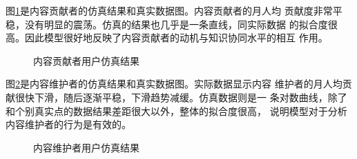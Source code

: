 图\ref{fig:simu3}是内容贡献者的仿真结果和真实数据图。内容贡献者的月人均
贡献度非常平稳，没有明显的震荡。仿真的结果也几乎是一条直线，同实际数据
的拟合度很高。因此模型很好地反映了内容贡献者的动机与知识协同水平的相互
作用。

\begin{figure}[!htb]
  \centering
  \caption{\small{内容贡献者用户仿真结果}}
  \label{fig:simu3}
\end{figure}

图\ref{fig:simu4}是内容维护者的仿真结果和真实数据图。实际数据显示内容
维护者的月人均贡献很快下滑，随后逐渐平稳，下滑趋势减缓。仿真数据则是一
条对数曲线，除了和个别真实点的数据结果差距很大以外，整体的拟合度很高，
说明模型对于分析内容维护者的行为是有效的。
\begin{figure}[!htb]
  \centering
  \caption{\small{内容维护者用户仿真结果}}
  \label{fig:simu4}
\end{figure}

